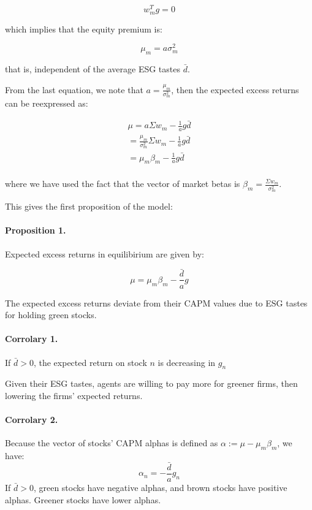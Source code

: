 \begin{equation}
    w_m^T g = 0
\end{equation}

which implies that the equity premium is:

\begin{equation}
    \mu_m = a \sigma_m^2
\end{equation}

that is, independent of the average ESG tastes $\bar{d}$.

From the last equation, we note that $a = \frac{\mu_m}{\sigma_m^2}$, then 
the expected excess returns can be reexpressed as: 

\begin{equation}
    \begin{aligned}
        \mu = a \Sigma w_m - \frac{1}{a} g \bar{d} \\
        = \frac{\mu_m}{\sigma_m^2} \Sigma w_m - \frac{1}{a} g \bar{d} \\
        = \mu_m \beta_m - \frac{1}{a} g \bar{d} \\
    \end{aligned}
\end{equation}

where we have used the fact that the 
vector of market betas is $\beta_m = \frac{\Sigma w_m}{\sigma_m^2}$.

This gives the first proposition of the model:

\paragraph{Proposition 1.}
Expected excess returns in equilibirium are given by:

\begin{equation}
    \mu = \mu_m \beta_m - \frac{\bar{d}}{a} g 
\end{equation}

The expected excess returns deviate from their CAPM values due to ESG 
tastes for holding green stocks.

\paragraph{Corrolary 1.}
If $\bar{d} > 0$, the expected return on stock $n$ is decreasing in $g_n$ 

Given their ESG tastes, agents are willing to pay more for greener firms, then 
lowering the firms' expected returns.

\paragraph{Corrolary 2.} Because the vector of stocks' CAPM alphas is defined as 
$\alpha := \mu - \mu_m \beta_m$, we have:
\begin{equation}
    \alpha_n = - \frac{\bar{d}}{a} g_n
\end{equation}
If $\bar{d} > 0$, green stocks have negative alphas, and brown stocks 
have positive alphas. Greener stocks have lower alphas.



